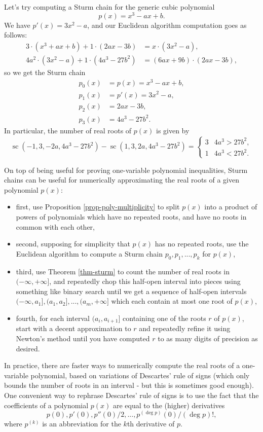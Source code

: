 Let's try computing a Sturm chain for the generic cubic polynomial
\[
p(x) = x^3 - ax + b.
\]
We have $p'(x) = 3x^2 - a$, and our Euclidean algorithm computation goes as follows:
\begin{align*}
3\cdot(x^3 + ax + b) + 1\cdot(2ax - 3b) &= x\cdot(3x^2 - a),\\
4a^2\cdot(3x^2 - a) + 1\cdot(4a^3 - 27b^2) &= (6ax + 9b)\cdot(2ax - 3b),
\end{align*}
so we get the Sturm chain
\begin{align*}
p_0(x) &= p(x) = x^3 - ax + b,\\
p_1(x) &= p'(x) = 3x^2 - a,\\
p_2(x) &= 2ax - 3b,\\
p_3(x) &= 4a^3 - 27b^2.
\end{align*}
In particular, the number of real roots of $p(x)$ is given by
\[
\operatorname{sc}(-1, 3, -2a, 4a^3 - 27b^2) - \operatorname{sc}(1, 3, 2a, 4a^3 - 27b^2) = \begin{cases}3 & 4a^3 > 27b^2,\\ 1 & 4a^3 < 27b^2.\end{cases}
\]

On top of being useful for proving one-variable polynomial inequalities, Sturm chains can be useful for numerically approximating the real roots of a given polynomial $p(x)$:
\begin{itemize}
\item first, use Proposition \ref{prop-poly-multiplicity} to split $p(x)$ into a product of powers of polynomials which have no repeated roots, and have no roots in common with each other,

\item second, supposing for simplicity that $p(x)$ has no repeated roots, use the Euclidean algorithm to compute a Sturm chain $p_0, p_1, ..., p_k$ for $p(x)$,

\item third, use Theorem \ref{thm-sturm} to count the number of real roots in $(-\infty, +\infty]$, and repeatedly chop this half-open interval into pieces using something like binary search until we get a sequence of half-open intervals $(-\infty, a_1], (a_1, a_2], ..., (a_m, +\infty]$ which each contain at most one root of $p(x)$,

\item fourth, for each interval $(a_i,a_{i+1}]$ containing one of the roots $r$ of $p(x)$, start with a decent approximation to $r$ and repeatedly refine it using Newton's method until you have computed $r$ to as many digits of precision as desired.
\end{itemize}
In practice, there are faster ways to numerically compute the real roots of a one-variable polynomial, based on variations of Descartes' rule of signs (which only bounds the number of roots in an interval - but this is sometimes good enough). One convenient way to rephrase Descartes' rule of signs is to use the fact that the coefficients of a polynomial $p(x)$ are equal to the (higher) derivatives
\[
p(0), p'(0), p''(0)/2, ..., p^{(\deg p)}(0)/(\deg p)!,
\]
where $p^{(k)}$ is an abbreviation for the $k$th derivative of $p$.

